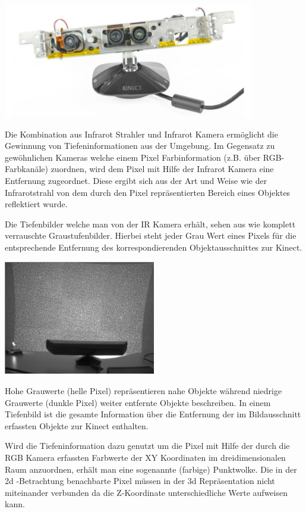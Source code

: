 \documentclass[
	12pt,
	a4paper,
	BCOR10mm,
	DIV14,
	listof=totoc,
	bibliography=totoc,
	headsepline
]{scrreprt}
\begin{document}
\includegraphics[height=5cm]{Res/Kinect_Components.png}



Die Kombination aus Infrarot Strahler und Infrarot Kamera ermöglicht die Gewinnung von Tiefeninformationen aus der Umgebung. Im Gegensatz zu gewöhnlichen Kameras welche einem Pixel Farbinformation (z.B.  über RGB-Farbkanäle) zuordnen, wird dem Pixel mit Hilfe der Infrarot Kamera eine Entfernung zugeordnet. Diese ergibt sich aus der Art und Weise wie der Infrarotstrahl von dem durch den Pixel repräsentierten Bereich eines Objektes reflektiert wurde.

Die Tiefenbilder welche man von der IR Kamera erhält, sehen aus wie komplett verrauschte Graustufenbilder. Hierbei steht jeder Grau Wert eines Pixels für die entsprechende Entfernung des korrespondierenden Objektausschnittes zur Kinect.



\includegraphics[height=5cm]{Res/Kinect_9Points.png}



Hohe Grauwerte (helle Pixel) repräsentieren nahe Objekte während niedrige Grauwerte (dunkle Pixel) weiter entfernte Objekte beschreiben. In einem Tiefenbild ist die gesamte Information über die Entfernung der im Bildausschnitt erfassten Objekte zur Kinect enthalten.

Wird die Tiefeninformation dazu genutzt um die Pixel mit Hilfe der durch die RGB Kamera erfassten Farbwerte der XY Koordinaten im dreidimensionalen Raum anzuordnen, erhält man eine sogenannte (farbige) Punktwolke. Die in der 2d 
-Betrachtung benachbarte Pixel müssen in der 3d Repräsentation nicht miteinander verbunden da die Z-Koordinate unterschiedliche Werte aufweisen kann.
\end{document}

